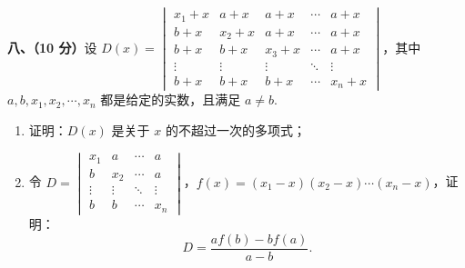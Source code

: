 \documentclass[a4paper,11pt]{ctexart}
\begin{document}
\textbf{八、（10 分）}设 $D(x) = \begin{vmatrix}
    x_1 + x & a + x & a + x & \cdots & a + x \\
    b + x & x_2 + x & a + x & \cdots & a + x \\
    b + x & b + x & x_3 + x & \cdots & a + x \\
    \vdots & \vdots & \vdots & \ddots & \vdots \\
    b + x & b + x & b + x & \cdots & x_n + x
  \end{vmatrix}$，其中 $a, b, x_1, x_2, \cdots, x_n$ 都是给定的实数，且满足 $a \neq b$.
\begin{enumerate}[label=(\arabic*), leftmargin=2.4em, itemsep=0.25em, topsep=0.3em]
  \item 证明：$D(x)$ 是关于 $x$ 的不超过一次的多项式；
  \item 令 $D = \begin{vmatrix}
    x_1 & a & \cdots & a \\
    b & x_2 & \cdots & a \\
    \vdots & \vdots & \ddots & \vdots \\
    b & b & \cdots & x_n
  \end{vmatrix}$，$f(x) = (x_1 - x)(x_2 - x)\cdots(x_n - x)$，证明：
  \[
    D = \frac{af(b) - bf(a)}{a - b}.
  \]
\end{enumerate}
\end{document}
